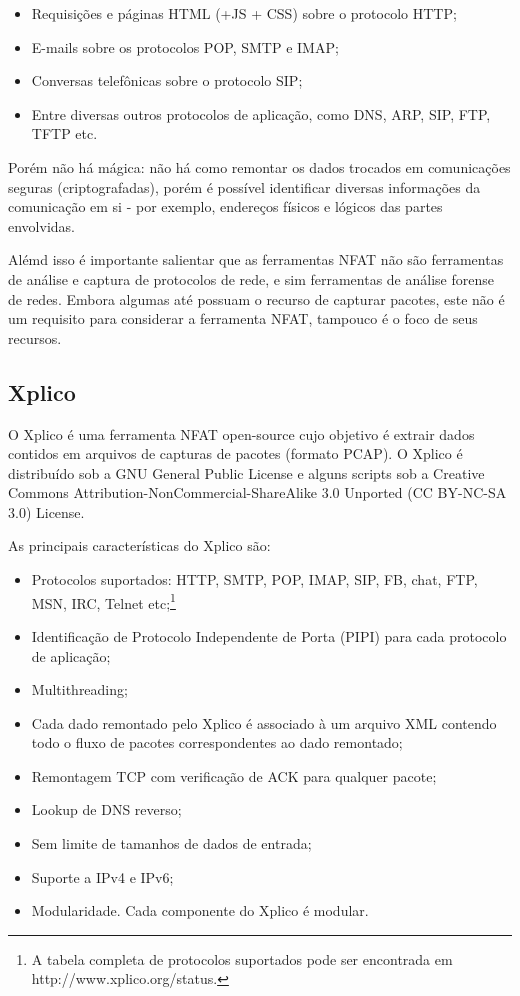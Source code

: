 \documentclass[12pt]{article}
\begin{document}
\begin{itemize}
  \item Requisições e páginas HTML (+JS + CSS) sobre o protocolo HTTP;
  \item E-mails sobre os protocolos POP, SMTP e IMAP;
  \item Conversas telefônicas sobre o protocolo SIP;
  \item Entre diversas outros protocolos de aplicação, como DNS, ARP, SIP, FTP, TFTP etc.
\end{itemize}

Porém não há mágica: não há como remontar os dados trocados em comunicações seguras (criptografadas), porém é possível identificar diversas informações da comunicação em si - por exemplo, endereços físicos e lógicos das partes envolvidas.

Alémd isso é importante salientar que as ferramentas NFAT não são ferramentas de análise e captura de protocolos de rede, e sim ferramentas de análise forense de redes. Embora algumas até possuam o recurso de capturar pacotes, este não é um requisito para considerar a ferramenta NFAT, tampouco é o foco de seus recursos.

\subsection{Xplico}

O Xplico é uma ferramenta NFAT open-source cujo objetivo é extrair dados contidos em arquivos de capturas de pacotes (formato PCAP). O Xplico é distribuído sob a GNU General Public License e alguns scripts sob a Creative Commons Attribution-NonCommercial-ShareAlike 3.0 Unported (CC BY-NC-SA 3.0) License.

As principais características do Xplico são:

\begin{itemize}
  \item Protocolos suportados: HTTP, SMTP, POP, IMAP, SIP, FB, chat, FTP, MSN, IRC, Telnet etc;\footnote{A tabela completa de protocolos suportados pode ser encontrada em http://www.xplico.org/status.}
  \item Identificação de Protocolo Independente de Porta (PIPI) para cada protocolo de aplicação;
  \item Multithreading;
  \item Cada dado remontado pelo Xplico é associado à um arquivo XML contendo todo o fluxo de pacotes correspondentes ao dado remontado;
  \item Remontagem TCP com verificação de ACK para qualquer pacote;
  \item Lookup de DNS reverso;
  \item Sem limite de tamanhos de dados de entrada;
  \item Suporte a IPv4 e IPv6;
  \item Modularidade. Cada componente do Xplico é modular.
\end{itemize}
\end{document}
